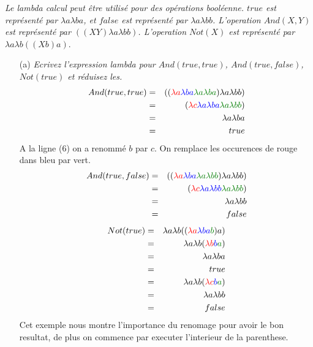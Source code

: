 \textit{Le lambda calcul peut être utilisé pour des opérations booléenne. $true$ est représenté par $\lambda a \lambda ba$, et $false$ est représenté par $\lambda a \lambda bb$. L'operation $And(X,Y)$ est représenté par $((XY)\lambda a \lambda bb)$. L'operation $Not(X)$ est représenté par $\lambda a \lambda b ((Xb)a)$}.
\begin{itemize}
	\item[(a)] \textit{Ecrivez l'expression lambda pour $And(true, true)$, $And(true, false)$, $Not(true)$ et réduisez les.}
	\begin{eqnarray}
		And(true, true) &=& ((\color{red}\lambda a \color{blue}\lambda ba \color{green}\lambda a \lambda ba \color{black}) \lambda a \lambda bb)\\
		&=& (\color{red}\lambda c \color{blue}\lambda a \lambda ba \color{green}\lambda a \lambda bb\color{black})\\
		&=& \lambda a \lambda ba \\
		&=& true
	\end{eqnarray}
	A la ligne (6) on a renommé $b$ par $c$. On remplace les occurences de \color{red}rouge \color{black} dans \color{blue}bleu \color{black} par \color{green}vert\color{black}.
	\begin{eqnarray}
		And(true, false) &=&  ((\color{red}\lambda a \color{blue}\lambda ba \color{green}\lambda a \lambda bb \color{black}) \lambda a \lambda bb)\\
		&=& (\color{red}\lambda c \color{blue}\lambda a \lambda bb \color{green}\lambda a \lambda bb\color{black})\\
		&=& \lambda a \lambda bb \\
		&=& false
	\end{eqnarray}
	\begin{eqnarray}
		Not(true) &=& \lambda a \lambda b ((\color{red}\lambda a \color{blue}\lambda ba \color{green}b\color{black}) a)\\
		&=& \lambda a \lambda b (\color{red}\lambda b\color{blue}b\color{green}a\color{black})\\
		&=& \lambda a \lambda ba\\
		&=& true\\
		&=& \lambda a \lambda b (\color{red}\lambda c\color{blue}b\color{green}a\color{black})\\
		&=& \lambda a \lambda bb \\
		&=& false
	\end{eqnarray}
	Cet exemple nous montre l'importance du renomage pour avoir le bon resultat, de plus on commence par executer l'interieur de la parenthese.

\end{itemize}
